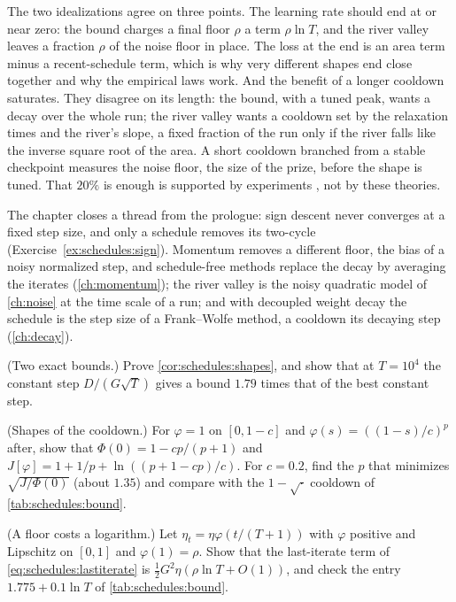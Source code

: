 \begin{refsection}
The two idealizations agree on three points. The learning rate should end at or near zero: the bound charges a final floor $\rho$ a term $\rho\ln T$, and the river valley leaves a fraction $\rho$ of the noise floor in place. The loss at the end is an area term minus a recent-schedule term, which is why very different shapes end close together and why the empirical laws work. And the benefit of a longer cooldown saturates. They disagree on its length: the bound, with a tuned peak, wants a decay over the whole run; the river valley wants a cooldown set by the relaxation times and the river's slope, a fixed fraction of the run only if the river falls like the inverse square root of the area. A short cooldown branched from a stable checkpoint measures the noise floor, the size of the prize, before the shape is tuned. That $20\%$ is enough is supported by experiments \parencite{HageleEtAl2024}, not by these theories.

The chapter closes a thread from the prologue: sign descent never converges at a fixed step size, and only a schedule removes its two-cycle (Exercise~\ref{ex:schedules:sign}). Momentum removes a different floor, the bias of a noisy normalized step, and schedule-free methods replace the decay by averaging the iterates (\cref{ch:momentum}); the river valley is the noisy quadratic model of \cref{ch:noise} at the time scale of a run; and with decoupled weight decay the schedule is the step size of a Frank--Wolfe method, a cooldown its decaying step (\cref{ch:decay}).

\begin{exercises}
\item \consolidation (Two exact bounds.) Prove \cref{cor:schedules:shapes}, and show that at $T=10^4$ the constant step $D/(G\sqrt T)$ gives a bound $1.79$ times that of the best constant step.\label{ex:schedules:exact}

\item \consolidation (Shapes of the cooldown.) For $\varphi=1$ on $[0,1-c]$ and $\varphi(s)=((1-s)/c)^p$ after, show that $\Phi(0)=1-cp/(p+1)$ and $J[\varphi]=1+1/p+\ln((p+1-cp)/c)$. For $c=0.2$, find the $p$ that minimizes $\sqrt{J/\Phi(0)}$ (about $1.35$) and compare with the $1-\sqrt\cdot$ cooldown of \cref{tab:schedules:bound}. \label{ex:schedules:shape}

\item \consolidation (A floor costs a logarithm.) Let $\eta_t=\eta\varphi(t/(T+1))$ with $\varphi$ positive and Lipschitz on $[0,1]$ and $\varphi(1)=\rho$. Show that the last-iterate term of \eqref{eq:schedules:lastiterate} is $\frac12G^2\eta(\rho\ln T+O(1))$, and check the entry $1.775+0.1\ln T$ of \cref{tab:schedules:bound}. \label{ex:schedules:floor}


\end{exercises}
\end{refsection}
